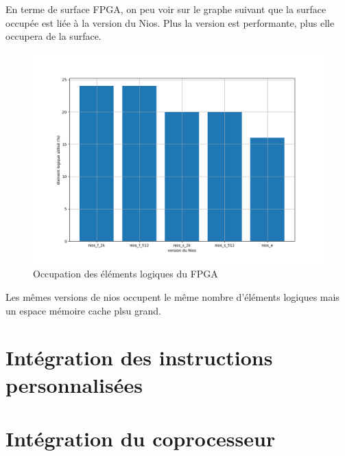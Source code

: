 \documentclass[12pt,a4paper]{article}
\begin{document}
En terme de surface FPGA, on peu voir sur le graphe suivant que la surface occupée est liée à la version du Nios. Plus la version est performante, plus elle occupera de la surface.
\begin{figure}[H]
	\centering
	\includegraphics[width=0.75\linewidth]{figures/plot}
	\caption{Occupation des éléments logiques du FPGA}
\end{figure}
Les mêmes versions de nios occupent le même nombre d'éléments logiques mais un espace mémoire cache plsu grand.


\section{Intégration des instructions personnalisées}
\section{Intégration du coprocesseur}
\end{document}
